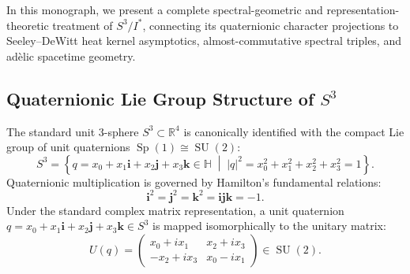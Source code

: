\documentclass[11pt,a4paper]{article}
\theoremstyle{definition}
\DeclareMathOperator{\Sp}{Sp}
\DeclareMathOperator{\SU}{SU}
\begin{document}
In this monograph, we present a complete spectral-geometric and representation-theoretic treatment of $S^3 / I^*$, connecting its quaternionic character projections to Seeley--DeWitt heat kernel asymptotics, almost-commutative spectral triples, and ad\`elic spacetime geometry.

\subsection{Quaternionic Lie Group Structure of $S^3$}
The standard unit 3-sphere $S^3 \subset \mathbb{R}^4$ is canonically identified with the compact Lie group of unit quaternions $\Sp(1) \cong \SU(2)$:
\begin{equation}
S^3 = \left\{ q = x_0 + x_1 \mathbf{i} + x_2 \mathbf{j} + x_3 \mathbf{k} \in \mathbb{H} \;\middle|\; |q|^2 = x_0^2 + x_1^2 + x_2^2 + x_3^2 = 1 \right\}.
\end{equation}
Quaternionic multiplication is governed by Hamilton's fundamental relations:
\begin{equation}
\mathbf{i}^2 = \mathbf{j}^2 = \mathbf{k}^2 = \mathbf{i}\mathbf{j}\mathbf{k} = -1.
\end{equation}
Under the standard complex matrix representation, a unit quaternion $q = x_0 + x_1 \mathbf{i} + x_2 \mathbf{j} + x_3 \mathbf{k} \in S^3$ is mapped isomorphically to the unitary matrix:
\begin{equation}
U(q) = \begin{pmatrix} x_0 + i x_1 & x_2 + i x_3 \\ -x_2 + i x_3 & x_0 - i x_1 \end{pmatrix} \in \SU(2).
\end{equation}
\end{document}
